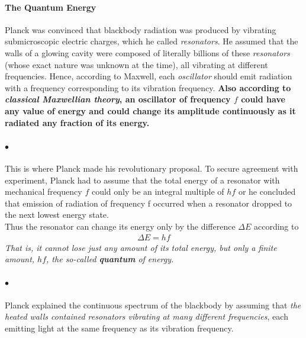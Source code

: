     \paragraph{\color{c3}The Quantum Energy}
    Planck was convinced that blackbody radiation was produced by vibrating submicroscopic 
    electric charges, which he called \textit{resonators}. He assumed that the walls of a glowing 
    cavity were composed of literally billions of these \textit{resonators} (whose exact nature was 
    unknown at the time), all vibrating at different frequencies. Hence, according to Maxwell, 
    each \textit{oscillator} should emit radiation with a frequency corresponding to its vibration 
    frequency. \textbf{Also according to \textit{classical Maxwellian theory}, an oscillator of frequency $f$ 
    could have \textbf{any} value of energy and could change its amplitude continuously as it 
    radiated any fraction of its energy.}

    \paragraph{$\bullet$} This is where Planck made his revolutionary proposal. 
    To secure agreement with experiment, Planck had to assume that the total energy of a 
    resonator with mechanical frequency $f$ could only be an integral multiple of $hf$ or
    he concluded that emission of radiation of frequency f occurred when a resonator dropped 
    to the next lowest energy state.\\
    Thus the resonator can change its energy only by the difference $\Delta{E}$ according to
    \begin{align} \label{eq:energy change of hf}
        \Delta{E} = hf
    \end{align}
    \textit{That is, it cannot lose just any amount of its total energy, but only a finite amount, $hf$, 
    the so-called \textbf{quantum} of energy.}
    
    \paragraph{$\bullet$} Planck explained the continuous spectrum of the blackbody by assuming 
    that \textit{the heated walls contained resonators vibrating at many different frequencies}, each 
    emitting light at the same frequency as its vibration frequency.

